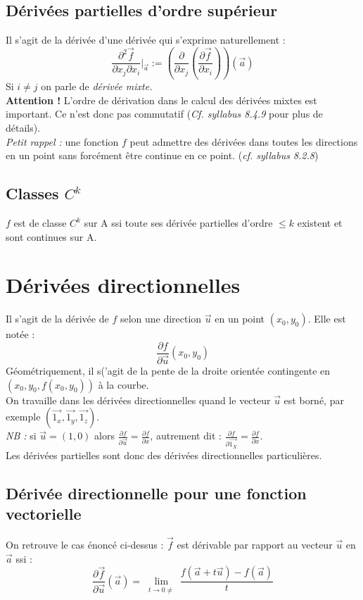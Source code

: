 \documentclass[11pt, a4paper, openany]{book}
\begin{document}
\subsection{Dérivées partielles d'ordre supérieur}
Il s'agit de la dérivée d'une dérivée qui s'exprime naturellement :
$$\frac{\partial^2\vec{f}}{\partial x_j \partial x_i}|_{\vec{a}} := \left(\frac{\partial}{\partial x_j}(\frac{\partial \vec{f}}{\partial x_i}) \right)(\vec{a})$$
Si $i \neq j$ on parle de \textit{dérivée mixte.}\\

\textbf{Attention !} L'ordre de dérivation dans le calcul des dérivées mixtes est important. Ce n'est donc pas commutatif (\textit{Cf. syllabus 8.4.9} pour plus de détails).\\
\textit{Petit rappel :} une fonction $f$ peut admettre des dérivées dans toutes les directions en un point sans forcément être continue en ce point. (\textit{cf. syllabus 8.2.8})

\subsection{Classes $C^k$}
$f$ est de classe $C^k$ sur A ssi toute ses dérivée partielles d'ordre $\leq k$ existent et sont continues sur A.

\section{Dérivées directionnelles}
Il s'agit de la dérivée de $f$ selon une direction $\vec{u}$ en un point $(x_0, y_0)$. Elle est notée :
$$\frac{\partial f}{\partial \vec{u}}(x_0, y_0)$$
Géométriquement, il s('agit de la pente de la droite orientée contingente en $(x_0, y_0, f(x_0, y_0))$ à la courbe.\\
On travaille dans les dérivées directionnelles quand le vecteur $\vec{u}$ est borné, par exemple $(\vec{1_x}, \vec{1_y}, \vec{1_z})$. \\

\textit{NB :} si $\vec{u} = (1,0)$ alors $\frac{\partial f}{\partial \vec{u}} = \frac{\partial f}{\partial x}$, autrement dit : $\frac{\partial f}{\partial\vec{1_X}} = \frac{\partial f}{\partial x}$.\\
Les dérivées partielles sont donc des dérivées directionnelles particulières.

\subsection{Dérivée directionnelle pour une fonction vectorielle}
On retrouve le cas énoncé ci-dessus : $\vec{f}$ est dérivable par rapport au vecteur $\vec{u}$ en $\vec{a}$ ssi : 
$$\frac{\partial\vec{f}}{\partial \vec{u}}(\vec{a}) = \lim\limits_{\substack{t \to 0 \neq}} \frac{f(\vec{a} + t\vec{u}) - f(\vec{a})}{t}$$
\end{document}
